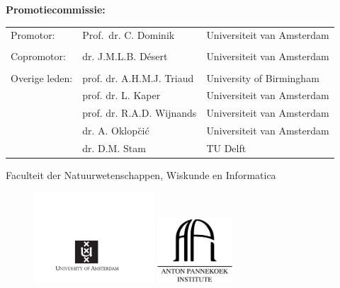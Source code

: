 \clearpage



{\bf\normalsize Promotiecommissie:} \\[0.2cm]

\begin{tabular}{@{}lll}
     Promotor:      & Prof.~dr. C. Dominik & Universiteit van Amsterdam\\ \\
		Copromotor:		 &	dr. J.M.L.B. D\'{e}sert &	Universiteit van Amsterdam\\ \\
	Overige leden:	& prof. dr. A.H.M.J. Triaud & University of Birmingham\\
                    & prof. dr. L. Kaper & Universiteit van Amsterdam\\
                    & prof. dr. R.A.D. Wijnands & Universiteit van Amsterdam\\
                    & dr. A. Oklop\u{c}i\'{c} & Universiteit van Amsterdam\\
                    & dr. D.M. Stam & TU Delft

\end{tabular}

\vspace*{0.2cm}
Faculteit der Natuurwetenschappen, Wiskunde en Informatica

\vspace*{\fill}

\begin{figure}[!h]
\includegraphics[width=0.4\textwidth]{gfx/titlepage/UvA_logo.pdf}
\hspace{4cm}
\includegraphics[width=0.25\textwidth]{gfx/titlepage/API_logo.pdf}
\end{figure}


